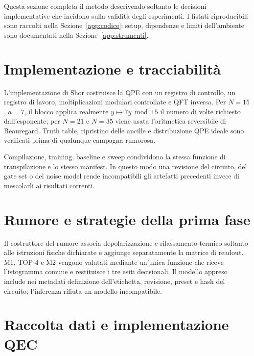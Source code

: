 \begin{onehalfspace}

Questa sezione completa il metodo descrivendo soltanto le decisioni
implementative che incidono sulla validità degli esperimenti. I listati
riproducibili sono raccolti nella Sezione~\ref{app:codice}; setup,
dipendenze e limiti dell'ambiente sono documentati nella
Sezione~\ref{app:strumenti}.

\section{Implementazione e tracciabilità}
\label{sec:setup}
\label{sec:gpu_limit}
\label{sec:impl_shor}

L'implementazione di Shor costruisce la \ac{QPE} con un registro di
controllo, un registro di lavoro, moltiplicazioni modulari controllate e
\ac{QFT} inversa. Per $N=15$, $a=7$, il blocco applica realmente
$y\mapsto 7y\bmod15$ il numero di volte richiesto dall'esponente; per
$N=21$ e $N=35$ viene usata l'aritmetica reversibile di Beauregard.
Truth table, ripristino delle ancille e distribuzione QPE ideale sono
verificati prima di qualunque campagna rumorosa.

Compilazione, training, baseline e sweep condividono la stessa funzione
di transpilazione e lo stesso manifest. In questo modo una revisione del
circuito, del gate set o del noise model rende incompatibili gli artefatti
precedenti invece di mescolarli ai risultati correnti.

\section{Rumore e strategie della prima fase}
\label{sec:noise_model}
\label{sec:impl_metodo1}
\label{sec:impl_metodo2}

Il costruttore del rumore associa depolarizzazione e rilassamento termico
soltanto alle istruzioni fisiche dichiarate e aggiunge separatamente la
matrice di readout. M1, TOP-4 e M2 vengono valutati mediante un'unica
funzione che riceve l'istogramma comune e restituisce i tre esiti
decisionali. Il modello appreso include nei metadati definizione
dell'etichetta, revisione, preset e hash del circuito; l'inferenza rifiuta
un modello incompatibile.

\section{Raccolta dati e implementazione QEC}
\label{sec:infrastruttura}
\label{sec:impl_qec}


\end{onehalfspace}
